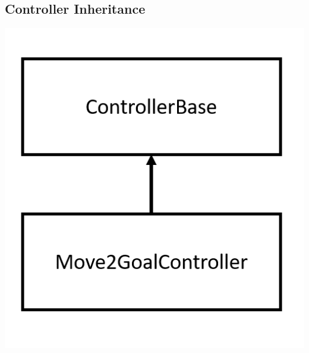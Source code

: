 \documentclass[a4paper,12pt]{article}
\begin{document}
	\subsection{Controller Inheritance}
	\label{appendix:controller}
	\includegraphics[scale=0.6]{images/controller_inheritance.png}
	
\end{document}
